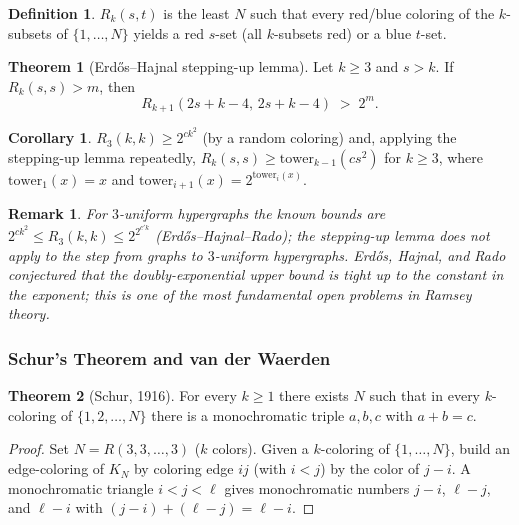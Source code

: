 \documentclass{article}
\newtheorem{remark}{Remark}
\theoremstyle{definition}
\newtheorem{theorem}{Theorem}
\newtheorem{corollary}{Corollary}
\newtheorem{definition}{Definition}
\begin{document}
\begin{definition}
$R_k(s, t)$ is the least $N$ such that every red/blue coloring of
the $k$-subsets of $\{1, \dots, N\}$ yields a red $s$-set (all
$k$-subsets red) or a blue $t$-set.
\end{definition}

\begin{theorem}[Erd\H{o}s--Hajnal stepping-up lemma]
Let $k \ge 3$ and $s > k$. If $R_k(s, s) > m$, then
\[
  R_{k+1}(2s + k - 4,\, 2s + k - 4) \;>\; 2^m.
\]
\end{theorem}

\begin{corollary}
$R_3(k, k) \ge 2^{c k^2}$ (by a random coloring) and, applying the
stepping-up lemma repeatedly, $R_k(s, s) \ge \text{tower}_{k-1}(cs^2)$
for $k \ge 3$, where $\text{tower}_1(x) = x$ and
$\text{tower}_{i+1}(x) = 2^{\text{tower}_i(x)}$.
\end{corollary}

\begin{remark}
For $3$-uniform hypergraphs the known bounds are
$2^{c k^2} \le R_3(k, k) \le 2^{2^{c' k}}$ (Erd\H{o}s--Hajnal--Rado);
the stepping-up lemma does not apply to the step from graphs to
$3$-uniform hypergraphs. Erd\H{o}s, Hajnal, and Rado conjectured that the
doubly-exponential \emph{upper} bound is tight up to the constant in the
exponent; this is one of the most fundamental open problems in Ramsey
theory.
\end{remark}

\subsubsection{Schur's Theorem and van der Waerden}

\begin{theorem}[Schur, 1916]
For every $k \ge 1$ there exists $N$ such that in every $k$-coloring
of $\{1, 2, \dots, N\}$ there is a monochromatic triple $a, b, c$ with
$a + b = c$.
\end{theorem}

\begin{proof}
Set $N = R(3, 3, \dots, 3)$ ($k$ colors). Given a $k$-coloring of
$\{1, \dots, N\}$, build an edge-coloring of $K_N$ by coloring edge
$ij$ (with $i < j$) by the color of $j - i$. A monochromatic triangle
$i < j < \ell$ gives monochromatic numbers $j - i$, $\ell - j$, and
$\ell - i$ with $(j - i) + (\ell - j) = \ell - i$.
\end{proof}
\end{document}
